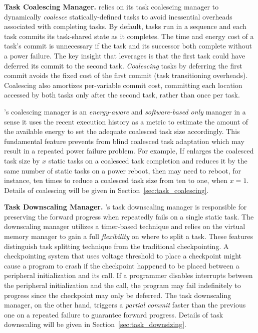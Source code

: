 \textbf{\sys Task Coalescing Manager.} \sys relies on its task coalescing manager to dynamically {\em coalesce} statically\hyp{}defined tasks to avoid inessential overheads associated with completing tasks. By default, tasks run in a sequence and each task commits its task-shared state as it completes. The time and energy cost of a task's commit is unnecessary if the task and its successor both complete without a power failure. The key insight that \sys leverages is that the first task could have deferred its commit to the second task. {\em Coalescing} tasks by deferring the first commit avoids the fixed cost of the first commit (task transitioning overheads). Coalescing also amortizes per-variable commit cost, committing each location accessed by both tasks only after the second task, rather than once per task. 

\sys's coalescing manager is an \emph{energy-aware} and \emph{software-based only} manager in a sense it uses the recent execution history as a metric to estimate the amount of the available energy to set the adequate coalesced task size accordingly. This fundamental feature prevents \sys from blind coalesced task adaptation which may result in a repeated power failure problem. For example, If \sys enlarges the coalesced task size by $x$ static tasks on a coalesced task completion and reduces it by the same number of static tasks on a power reboot, then \sys may need to reboot, for instance, ten times to reduce a coalesced task size from ten to one, when $x=1$. Details of coalescing will be given in Section~\ref{sec:task_coalescing}.

\textbf{\sys Task Downscaling Manager.} \sys's task downscaling manager is responsible for preserving the forward progress when \sys repeatedly fails on a single static task. The downscaling manager utilizes a timer-based technique and relies on the virtual memory manager to gain a full \emph{flexibility} on where to split a task. These features distinguish \sys task splitting technique from the traditional checkpointing. A checkpointing system that uses voltage threshold to place a checkpoint might cause a program to crash if the checkpoint happened to be placed between a peripheral initialization and its call. If a programmer disables interrupts between the peripheral initialization and the call, the program may fail indefinitely to progress since the checkpoint may only be deferred. The \sys task downscaling manager, on the other hand, triggers a \emph{partial commit} faster than the previous one on a repeated failure to guarantee forward progress. Details of task downscaling will be given in Section~\ref{sec:task_downsizing}.

